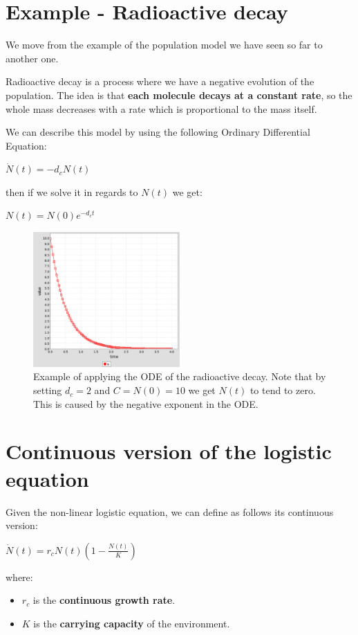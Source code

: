 \section{Example - Radioactive decay}
We move from the example of the population model we have seen so far to another one.
\par Radioactive decay is a process where we have a negative evolution of the population. The idea is that \textbf{each molecule decays at a constant rate}, so the whole mass decreases with a rate which is proportional to the mass itself.
\par We can describe this model by using the following Ordinary Differential Equation:

\begin{center}
    $\dot{N}(t) = -d_{c}N(t)$
\end{center}
then if we solve it in regards to $N(t)$ we get:
\begin{center}
    $N(t) = N(0)e^{-d_{c}t}$
\end{center}

\begin{figure}[h]
    \centering
    \includegraphics[width=0.5\textwidth]{Images/03 - Contiguous Dynamicsl System/Radioactive_decay.png}
    \caption{Example of applying the ODE of the radioactive decay. Note that  by setting $d_{c} = 2$ and $C = N(0) = 10$ we get $N(t)$ to tend to zero. This is caused by the negative exponent in the ODE.} 
\end{figure}

\section{Continuous version of the logistic equation}
Given the non-linear logistic equation, we can define as follows its continuous version:
\begin{center}
    $\dot{N}(t) = r_{c}N(t)(1 - \frac{N(t)}{K})$
\end{center}
where:
\begin{itemize}
    \item $r_{c}$ is the \textbf{continuous growth rate}.

    \item $K$ is the \textbf{carrying capacity} of the environment.
\end{itemize}

